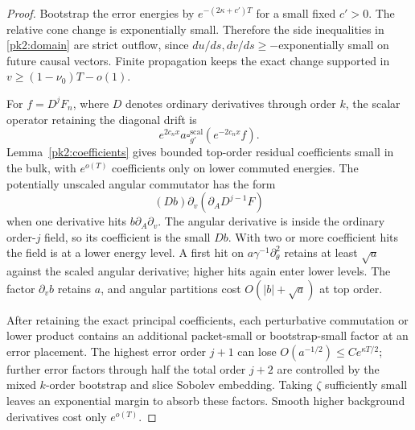 \begin{proof}
Bootstrap the
error energies by $e^{-(2\kappa+c')T}$ for a small fixed $c'>0$.
The relative cone change is exponentially small. Therefore the
side inequalities in \eqref{pk2:domain} are strict outflow, since
$du/ds,dv/ds\ge-$exponentially small on future causal vectors.
Finite propagation keeps the exact change supported in
$v\ge(1-\nu_0)T-o(1)$.

For $f=D^jF_n$, where $D$ denotes ordinary derivatives through order
$k$, the scalar operator retaining the diagonal drift is
\[
 e^{2c_nx}a\square_{g'}^{\mathrm{scal}}(e^{-2c_nx}f).
\]
Lemma~\ref{pk2:coefficients} gives bounded top-order residual
coefficients small in the bulk, with $e^{o(T)}$ coefficients only
on lower commuted energies. The potentially unscaled angular
commutator has the form
\[
 (Db)\partial_v(\partial_AD^{j-1}F)
\]
when one derivative hits $b\partial_A\partial_v$. The angular
derivative is inside the ordinary order-$j$ field, so its coefficient
is the small $Db$. With two or more coefficient hits the field is at
a lower energy level. A first hit on $a\gamma^{-1}\partial_\theta^2$
retains at least $\sqrt a$ against the scaled angular derivative;
higher hits again enter lower levels. The factor $\partial_vb$
retains $a$, and angular partitions cost $O(|b|+\sqrt a)$ at top
order.

After retaining the exact principal coefficients, each perturbative
commutation or lower product contains an additional packet-small or
bootstrap-small factor at an error placement. The highest error
order $j+1$ can lose $O(a^{-1/2})\le Ce^{\kappa T/2}$; further
error factors through half the total order $j+2$ are controlled by
the mixed $k$-order bootstrap and slice Sobolev embedding. Taking
$\zeta$ sufficiently small leaves an exponential margin to absorb
these factors. Smooth higher background derivatives cost only
$e^{o(T)}$.


\end{proof}
